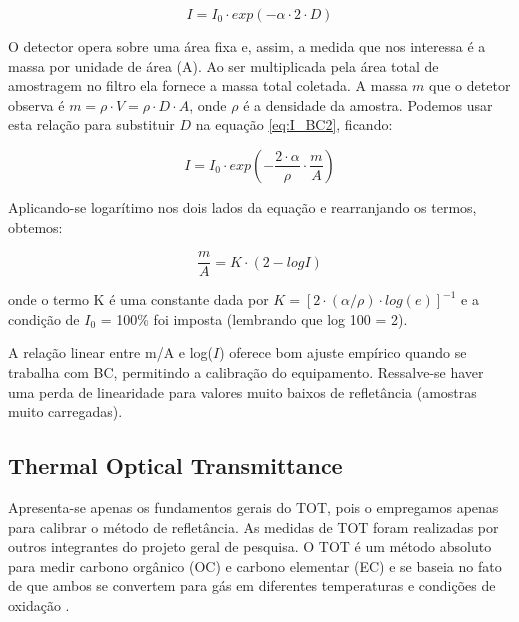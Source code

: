 \begin{equation}
  \label{eq:I_BC2}
  I = I_0 \cdot exp(-\alpha \cdot 2 \cdot D)
\end{equation}

O detector opera sobre uma área fixa e, assim, a medida que nos interessa é a 
massa por unidade de área (A). Ao ser multiplicada pela área total de amostragem
no filtro ela fornece a massa total coletada. A massa $m$ que o detetor observa 
é $m = \rho \cdot V = \rho \cdot D \cdot A$, onde $\rho$ é a densidade da amostra. 
Podemos usar esta relação para substituir $D$ na equação \ref{eq:I_BC2}, 
ficando:

\begin{equation}
  \label{m/a}
  I = I_0 \cdot exp \left( -\frac{2 \cdot \alpha}{\rho} \cdot \frac{m}{A} \right)
\end{equation}

Aplicando-se logarítimo nos dois lados da equação e rearranjando os termos, 
obtemos:

\begin{equation}
  \label{m/a_2}
  \frac{m}{A} = K \cdot (2-logI) 
\end{equation}

onde o termo K é uma constante dada por $K = [2 \cdot ({\alpha}/{\rho}) \cdot log(e)]^{-1}$ e
a condição de $I_0$ = 100\% foi imposta (lembrando que log 100 = 2).

A relação linear entre m/A e log($I$) oferece bom ajuste empírico 
quando se trabalha com BC, permitindo a calibração do equipamento. 
Ressalve-se haver uma perda de linearidade para valores muito baixos de 
refletância (amostras muito carregadas).  

\subsection{Thermal Optical Transmittance}

Apresenta-se apenas os fundamentos gerais do TOT, pois o empregamos apenas para
calibrar o método de refletância. As medidas de TOT foram realizadas por outros
integrantes do projeto geral de pesquisa.
O TOT é um método absoluto para medir carbono orgânico (OC) e 
carbono elementar (EC) e se baseia no fato de que ambos se convertem para gás 
em diferentes temperaturas e condições de oxidação \citep{birch1998}.

